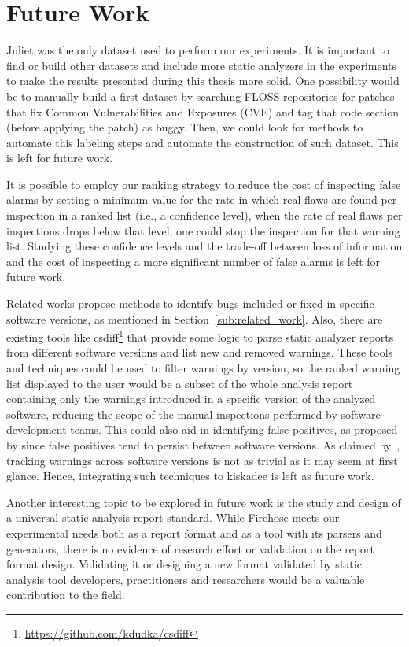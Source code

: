\section{Future Work}

Juliet was the only dataset used to perform our experiments. It is important to
find or build other datasets and include more static analyzers in the
experiments to make the results presented during this thesis more solid. One
possibility would be to manually build a first dataset by searching FLOSS
repositories for patches that fix Common Vulnerabilities and Exposures (CVE)
and tag that code section (before applying the patch) as buggy. Then, we could
look for methods to automate this labeling steps and automate the construction
of such dataset. This is left for future work.

It is possible to employ our ranking strategy to reduce the cost of
inspecting false alarms by setting a minimum value for the rate in which real
flaws are found per inspection in a ranked list (i.e., a confidence level),
when the rate of real flaws per inspections drops below that level, one could
stop the inspection for that warning list. Studying these confidence levels and
the trade-off between loss of information and the cost of inspecting a more significant
number of false alarms is left for future work.

Related works propose methods to identify bugs included or fixed in specific
software versions, as mentioned in Section~\ref{sub:related_work}.  Also, there
are existing tools like csdiff\footnote{\url{https://github.com/kdudka/csdiff}}
that provide some logic to parse static analyzer reports from different
software versions and list new and removed warnings.  These tools and
techniques could be used to filter warnings by version, so the ranked warning
list displayed to the user would be a subset of the whole analysis report
containing only the warnings introduced in a specific version of the analyzed
software, reducing the scope of the manual inspections performed by software
development teams.  This could also aid in identifying false positives, as
proposed by \cite{kim_which_2007} since false positives tend to
persist between software versions. As claimed by~\cite{spacco_tracking_2006}, tracking warnings across software versions is
not as trivial as it may seem at first glance. Hence, integrating such techniques
to kiskadee is left as future work.

Another interesting topic to be explored in future work is the study and design
of a universal static analysis report standard. While Firehose meets our
experimental needs both as a report format and as a tool with its parsers and
generators, there is no evidence of research effort or validation on the report
format design. Validating it or designing a new format validated by static
analysis tool developers, practitioners and researchers would be a valuable
contribution to the field.

